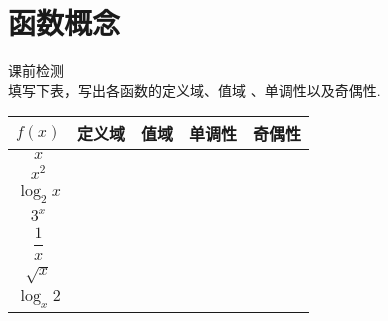 \section{函数概念}
  \begin{exercise}{\heiti 课前检测}\\
    填写下表，写出各函数的定义域、值域 、单调性以及奇偶性.\
    \vspace{-2em}
    \begin{center}
      \renewcommand{\arraystretch}{1.4}
      \begin{tabular}{|c|c|c|c|c|}
        \hline
      $f(x)$&\mbox{\hspace{1.5em}定义域\hspace{1.5em}}&\mbox{\hspace{2em}值域\hspace{2em}}&\mbox{\hspace{8em}单调性\hspace{8em}}&\mbox{\hspace{1.2em}奇偶性\hspace{1.2em}}\\
        \hline
        $x$&&&&\\
        \hline
        $x^2$&&&&\\
        \hline
        $\log_2x$&&&&\\
        \hline
        $3^x$&&&&\\
        \hline
        $\dfrac{1}{x}$&&&&\\
        \hline
        $\sqrt{x}$&&&&\\
        \hline
        $\log_x2$&&&&\\
        \hline
      \end{tabular}\\
    \end{center}
  \end{exercise}
